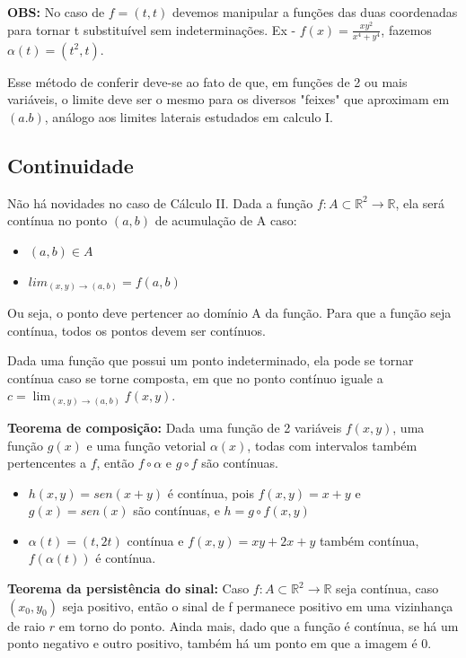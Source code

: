 \documentclass[letterpaper, 11pt]{article}
\begin{document}
\textbf{OBS:} No caso de \(f=(t,t)\) devemos manipular a funções das duas coordenadas para tornar t substituível sem indeterminações. Ex - \(f(x) = \frac{xy^2}{x^4+y^4}\), fazemos \(\alpha(t) = (t^2,t)\).

Esse método de conferir deve-se ao fato de que, em funções de 2 ou mais variáveis, o limite deve ser o mesmo para os diversos "feixes" que aproximam em \((a.b)\), análogo aos limites laterais
estudados em calculo I.

\subsection{Continuidade}
\label{sec:orge0fd8e3}
Não há novidades no caso de Cálculo II. Dada a função \(f: A \subset \mathbb{R}^2 \to \mathbb{R}\), ela será contínua no ponto \((a,b)\) de acumulação de A caso:
\begin{itemize}
\item \((a,b) \in A\)
\item \(lim_{(x,y) \to (a,b)} = f(a,b)\)
\end{itemize}

Ou seja, o ponto deve pertencer ao domínio A da função. Para que a função seja contínua, todos os pontos devem ser contínuos.

Dada uma função que possui um ponto indeterminado, ela pode se tornar contínua caso se torne composta, em que no ponto contínuo iguale a \(c = \lim_{(x,y) \to (a,b)} f(x,y)\).

\textbf{Teorema de composição:} Dada uma função de 2 variáveis \(f(x,y)\), uma função \(g(x)\) e uma função vetorial \(\alpha (x)\), todas com intervalos também pertencentes a \(f\), então \(f \circ \alpha\) e \(g \circ f\) são contínuas.

\begin{itemize}
\item \(h(x,y) = sen(x+y)\) é contínua, pois \(f(x,y) = x+y\) e \(g(x) = sen(x)\) são contínuas, e \(h = g \circ f(x,y)\)
\item \(\alpha (t) = (t,2t)\) contínua e \(f(x,y) = xy + 2x + y\) também contínua, \(f(\alpha(t))\) é contínua.
\end{itemize}

\textbf{Teorema da persistência do sinal:} Caso \(f : A \subset \mathbb{R}^2 \to \mathbb{R}\) seja contínua, caso \((x_0, y_0)\) seja positivo, então o sinal de f permanece positivo em uma vizinhança de raio \(r\) em torno do ponto.
Ainda mais, dado que a função é contínua, se há um ponto negativo e outro positivo, também há um ponto em que a imagem é 0.
\end{document}
